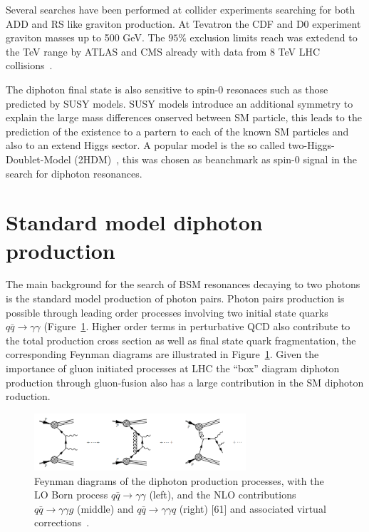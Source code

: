 Several searches have been performed at collider experiments searching for both ADD and RS like graviton
production. At Tevatron the CDF and D0 experiment graviton masses up to 500 GeV\cite{cdf_dipho, d0_dipho}.
The $95\%$ exclusion limits reach was extedend to the TeV range by ATLAS and CMS already with data from 8 TeV LHC
collisions~\cite{atlas_dipho_2012, cms_dipho_2012_1}.

The diphoton final state is also sensitive to spin-0 resonaces such as those predicted by SUSY models. SUSY models
introduce an additional symmetry to explain the large mass differences onserved between SM particle, this leads
to the prediction of the existence to a partern to each of the known SM particles and also to an extend Higgs sector.
A popular model is the so called two-Higgs-Doublet-Model (2HDM)~\cite{spin0_1,spin0_2}, this was chosen as beanchmark as
spin-0 signal in the search for diphoton resonances.

\section{Standard model diphoton production}
\label{sec:sm_dipho_prod}
The main background for the search of BSM resonances decaying to two photons is the standard model production
of photon pairs. Photon pairs production is possible through leading order processes involving two
initial state quarks $q\bar{q}\to\gamma\gamma$ (Figure~\ref{fig:lo_dipho}. Higher order terms in perturbative QCD also contribute to
the total production cross section as well as final state quark fragmentation,
the corresponding Feynman diagrams are illustrated in Figure~\ref{fig:lo_dipho}.
Given the importance of gluon initiated processes at LHC the ``box'' diagram diphoton production through gluon-fusion
also has a large contribution in the SM diphoton roduction.

\begin{figure}[hb]
  \centering
  \includegraphics[width = 0.7\textwidth]{figures/introduction/lo.png}
  \caption{
    Feynman diagrams of the diphoton production processes, with the LO Born
    process $q\bar{q}\to\gamma\gamma$ (left), and the NLO contributions $q\bar{q}\to\gamma\gamma g$ (middle) and
    $q\bar{q}\to\gamma\gamma q$ (right) [61] and associated virtual corrections~\cite{61}.
  }
  \label{fig:lo_dipho}
\end{figure}

